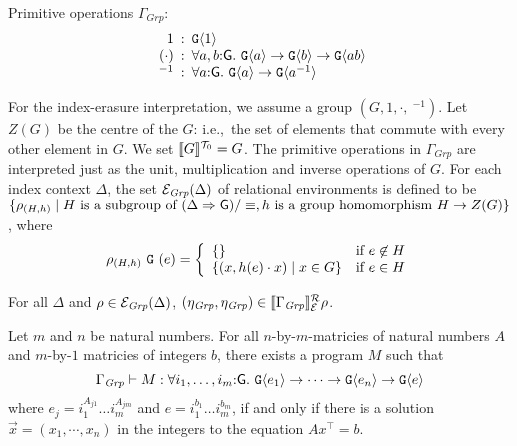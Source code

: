 \newcommand{\Grp}{\mathit{Grp}}

Primitive operations $\Gamma_\Grp$:
\begin{displaymath}
  \begin{array}{r@{\hspace{0.5em}:\hspace{0.5em}}l}
    1 & \tyPrim{G}{1} \\
    (\cdot) & \forall a,b\mathord:\mathsf{G}.\ \tyPrim{G}{a} \to \tyPrim{G}{b} \to \tyPrim{G}{a b} \\
    \ ^{-1} & \forall a\mathord:\mathsf{G}.\ \tyPrim{G}{a} \to \tyPrim{G}{a^{-1}}
  \end{array}
\end{displaymath}

For the index-erasure interpretation, we assume a group $(G, 1, \cdot,
\ ^{-1})$. Let $Z(G)$ be the centre of the $G$: i.e.,~the set of
elements that commute with every other element in $G$. We set
$\llbracket G \rrbracket^{\mathcal{T}_0} = G$. The primitive operations in $\Gamma_\Grp$ are
interpreted just as the unit, multiplication and inverse operations
of $G$. For each index context $\Delta$, the set
$\relEnv{E}_\Grp(\Delta)$ of relational environments is defined to be
$\{ \rho_{(H,h)} \mathrel| H\textrm{ is a subgroup of }(\Delta
\Rightarrow \mathsf{G})/\equiv, h\textrm{ is a group homomorphism }H
\to Z(G) \}$, where
\begin{displaymath}
  \rho_{(H,h)}\ \tyPrimNm{G}\ (e) = \left\{
    \begin{array}{ll}
      \{ \} & \textrm{if}\ e\not\in H \\
      \{ (x, h(e)\cdot x) \sepbar x \in G \} & \textrm{if}\ e\in H
    \end{array}
  \right.
\end{displaymath}

\begin{lemma}
  For all $\Delta$ and $\rho \in \relEnv{E}_\Grp(\Delta)$,
  $(\eta_\Grp,\eta_\Grp) \in \rsem{\Gamma_\Grp}{\relEnv{E}}\rho$.
\end{lemma}

\begin{theorem}
  Let $m$ and $n$ be natural numbers. For all $n$-by-$m$-matricies of
  natural numbers $A$ and $m$-by-$1$ matricies of integers $b$,
  there exists a program $M$ such that
  \begin{equation}
    \label{eq:fo-group-type}
    \Gamma_\Grp \vdash M : \forall i_1,\dots,i_m\mathord:\mathsf{G}.\ \tyPrim{G}{e_1} \to \dots \to \tyPrim{G}{e_n} \to \tyPrim{G}{e}
  \end{equation}
  where $e_j = i_1^{A_{j1}}\dots i_m^{A_{jm}}$ and $e = i_1^{b_1}\dots
  i_m^{b_m}$, if and only if there is a solution $\vec{x} =
  (x_1,\cdots,x_n)$ in the integers to the equation $A x^\top = b$.
\end{theorem}

